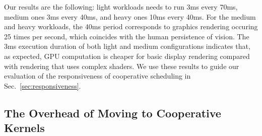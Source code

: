\documentclass[numbers,nocopyrightspace,10pt]{sigplanconf}
\newcommand{\mytablong}{Table~}
\newcommand{\mysec}{Sec.~}
\begin{document}
Our results are the following: light workloads needs to run 3ms every
70ms, medium ones 3ms every 40ms, and heavy ones 10ms every 40ms. For
the medium and heavy workloads, the 40ms period corresponds to graphics
rendering occuring 25 times per second, which coincides with the human
persistence of vision. The 3ms execution duration of both light and
medium configurations indicates that, as expected, GPU computation is
cheaper for basic display rendering compared with rendering that uses
complex shaders. We use these results to guide our evaluation of the
responsiveness of cooperative scheduling in
\mysec\ref{sec:responsiveness}.



\subsection{The Overhead of Moving to Cooperative Kernels}\label{sec:overhead}

\end{document}
